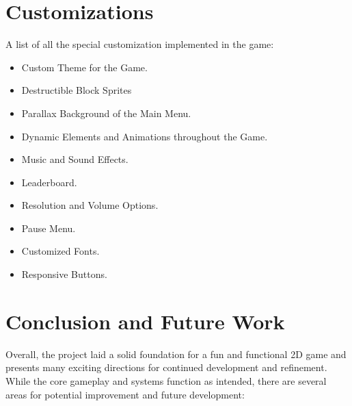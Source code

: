 \documentclass[10.5pt]{article}
\begin{document}
\section{Customizations}
A list of all the special customization implemented in the game:
    \begin{itemize}
        \item Custom Theme for the Game.
        \item Destructible Block Sprites
        \item Parallax Background of the Main Menu.
        \item Dynamic Elements and Animations throughout the Game.
        \item Music and Sound Effects.
        \item Leaderboard.
        \item Resolution and Volume Options.
        \item Pause Menu.
        \item Customized Fonts.
        \item Responsive Buttons.
    \end{itemize}
    
\section{Conclusion and Future Work}

Overall, the project laid a solid foundation for a fun and functional 2D game and presents many exciting directions for continued development and refinement. \\
While the core gameplay and systems function as intended, there are several areas for potential improvement and future development:
\end{document}
